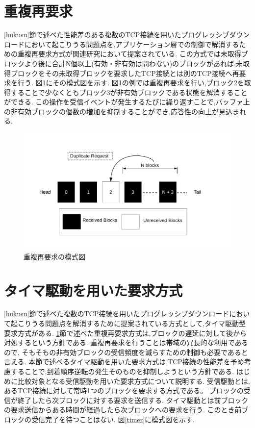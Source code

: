 \documentclass[a4j,12pt]{gradthesis_utf8}
\begin{document}
 \section{重複再要求}
 \label{juhuku}
 \ref{hukusu}節で述べた性能差のある複数のTCP接続を用いたプログレッシブダウンロードにおいて起こりうる問題点を,アプリケーション層での制御で解消するための重複再要求方式が関連研究\cite{proxy}において提案されている.
 この方式では未取得ブロックより後に合計N個以上(有効・非有効は問わない)のブロックがあれば,未取得ブロックをその未取得ブロックを要求したTCP接続とは別のTCP接続へ再要求を行う.
 図\ref{blockdup}にその模式図を示す.
 図\ref{blockdup}の例では重複再要求を行い,ブロック2を取得することで少なくともブロック3が非有効ブロックである状態を解消することができる.
 この操作を受信イベントが発生するたびに繰り返すことで,バッファ上の非有効ブロックの個数の増加を抑制することができ,応答性の向上が見込まれる.
 
 \begin{figure}[ht]
     \centering
     \includegraphics[width=18.5cm]{figure/block_dup.pdf}
     \caption{重複再要求の模式図}
     \label{blockdup}
 \end{figure}

\newpage
 
\section{タイマ駆動を用いた要求方式}
\ref{hukusu}節で述べた複数のTCP接続を用いたプログレッシブダウンロードにおいて起こりうる問題点を解消するために提案されている方式として,タイマ駆動型要求方式がある\cite{horiba}.
\ref{juhuku}節で述べた重複再要求方式は,ブロックの遅延に対して後から対処するという方針である.
重複再要求を行うことは帯域の冗長的な利用であるので,
そもそもの非有効ブロックの受信頻度を減らすための制御も必要であると言える.
本節で述べるタイマ駆動を用いた要求方式は,TCP接続の性能差を予め考慮することで,到着順序逆転の発生そのものを抑制しようという方針である.
はじめに比較対象となる受信駆動を用いた要求方式について説明する.
受信駆動とは,あるTCP接続に対して常時1つのブロックを要求する方式である。
ブロックの受信が終了したら次ブロックに対する要求を送信する.
タイマ駆動とは前ブロックの要求送信からある時間が経過したら次ブロックへの要求を行う.
このとき前ブロックの受信完了を待つことはない.
図\ref{timer}に模式図を示す.
\end{document}
